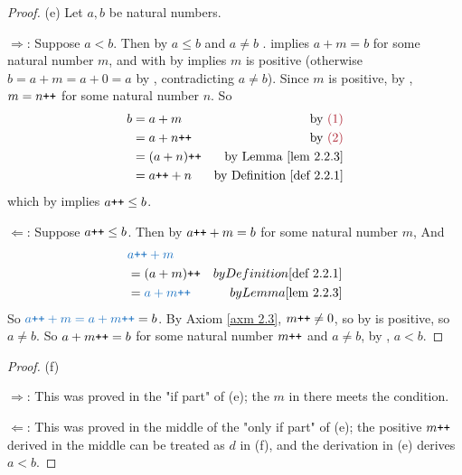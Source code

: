 \begin{proof}{(e)}
Let \(a, b\) be natural numbers.

\(\Longrightarrow \): Suppose \(a < b\). Then by  \(a \leq b\)  and \(a \neq b\) .  implies \(a + m = b\)  for some natural number \(m\), and with  by  implies \(m\) is positive (otherwise \(b = a + m = a + 0 = a\) by , contradicting \(a \neq b\)). Since \(m\) is positive, by , \(m = n\texttt{++}\)  for some natural number \(n\). So
\begin{align*}
    b & = a + m & \text{by \MAROON{(1)}}\\
      & = a + n\INC & \text{by \MAROON{(2)}}\\
      & = (a + n)\INC & \text{by \LEM{2.2.3}} \\
      & = a\INC + n & \text{by \DEF{2.2.1}}
\end{align*}
which by  implies \(a\texttt{++} \leq b\).

\( \Longleftarrow \): Suppose \(a\texttt{++} \leq b\). Then by  \(a\texttt{++} + m = b\) for some natural number \(m\), And
\begin{align*}
    & \BLUE{a\INC + m} \\
    & = (a + m)\INC & by \DEF{2.2.1} \\
    & = \BLUE{a + m\INC} & by \LEM{2.2.3}
\end{align*}
So \(\BLUE{a\INC + m = a + m\INC} = b\). By Axiom \ref{axm 2.3}, \(m\texttt{++} \neq 0\), so by  is positive, so \(a \neq b\). So \(a + m\texttt{++} = b\) for some natural number \(m\texttt{++}\) and \(a \neq b\), by , \(a < b\).
\end{proof}

\begin{proof}{(f)}

\( \Longrightarrow \): This was proved in the "if part" of (e); the \(m\) in there meets the condition.

\( \Longleftarrow \): This was proved in the middle of the "only if part" of (e); the positive \(m\texttt{++}\) derived in the middle can be treated as \(d\) in (f), and the derivation in (e) derives \(a < b\).
\end{proof}

